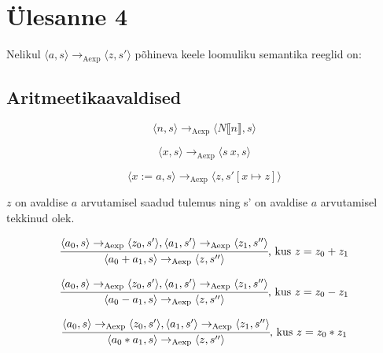 \section{Ülesanne 4}

Nelikul \(\langle a, s \rangle \rightarrow _\mathrm{Aexp} \langle z,s' \rangle\) põhineva
keele loomuliku semantika reeglid on:

\subsection{Aritmeetikaavaldised}
\[
\langle n, s \rangle \rightarrow _\mathrm{Aexp} \langle N \llbracket n \rrbracket, s \rangle
\]

\[
\langle x, s \rangle \rightarrow _\mathrm{Aexp} \langle s \  x, s \rangle
\]

\[
\langle x := a, s \rangle
\rightarrow _\mathrm{Aexp}
\langle z, s'[x \mapsto z] \rangle
\]

\(z\) on avaldise \(a\) arvutamisel saadud tulemus ning s' on avaldise \(a\)
arvutamisel tekkinud olek.

\[
  \cfrac{
    \langle a_0, s \rangle \rightarrow _\mathrm{Aexp} \langle z_0, s' \rangle
    , 
    \langle a_1, s' \rangle \rightarrow _\mathrm{Aexp} \langle z_1, s'' \rangle
  }{
    \langle a_0 + a_1, s \rangle \rightarrow _\mathrm{Aexp} \langle z, s'' \rangle
  }\text{,\ kus\ } z = z_0 + z_1
\]

\[
  \cfrac{
    \langle a_0, s \rangle \rightarrow _\mathrm{Aexp} \langle z_0, s' \rangle
    , 
    \langle a_1, s' \rangle \rightarrow _\mathrm{Aexp} \langle z_1, s'' \rangle
  }{
    \langle a_0 - a_1, s \rangle \rightarrow _\mathrm{Aexp} \langle z, s'' \rangle
  }\text{,\ kus\ } z = z_0 - z_1
\]

\[
  \cfrac{
    \langle a_0, s \rangle \rightarrow _\mathrm{Aexp} \langle z_0, s' \rangle
    , 
    \langle a_1, s' \rangle \rightarrow _\mathrm{Aexp} \langle z_1, s'' \rangle
  }{
    \langle a_0 * a_1, s \rangle \rightarrow _\mathrm{Aexp} \langle z, s'' \rangle
  }\text{,\ kus\ } z = z_0 * z_1
\]

